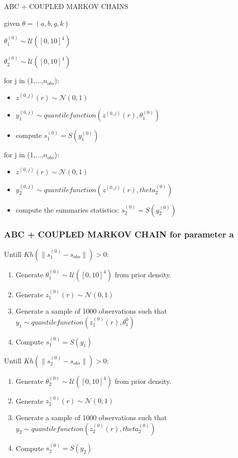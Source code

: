 \documentclass{beamer}
\begin{document}
\begin{section}{ABC + COUPLED MARKOV CHAINS}
\begin{frame}
	given $\theta =( a,b,g,k )$
	
	$ \theta_{1}^{(0)} \sim \mathcal{U}([0,10]^4)$
	
	$ \theta_{2}^{(0)} \sim \mathcal{U}([0,10]^4)$
	
	for j in (1,...,$n_{obs}$):
	\begin{itemize}
		\item $z^{(0,j)}(r) \sim \mathcal{N}(0,1)  $
		
		\item $ y_{1}^{(0,j)} \sim quantilefunction(z^{(0,j)}(r),\theta_{1}^{(0)})$
		
		\item compute $ s_{1}^{(0)} =S(y_{1}^{(0)})$
	\end{itemize}
	for j in (1,...,$n_{obs}$):
	
	\begin{itemize}
		\item $z^{(0,j)}(r) \sim \mathcal{N}(0,1)  $
		
		\item $ y_{2}^{(0,j)} \sim quantile function(z^{(0,j)}(r),theta_{2}^{(0)})$
		
		\item compute the summaries statistics:
		$ s_{2}^{(0)} =S(y_{2}^{(0)})$
	\end{itemize}
	
\end{frame}
\begin{frame}
	\frametitle{ABC + COUPLED MARKOV CHAIN for parameter a}
	Untill $Kh(\|s_{1}^{(0)} - s_{obs}\|)>0$:
	\begin{enumerate}
		\item Generate $\theta_{1}^{(0)} \sim \mathcal{U}([0,10]^4)$ from prior density.
		\item Generate $z_{1}^{(0)}(r) \sim \mathcal{N}(0,1)$
		\item Generate a sample of 1000 observations such that $y_{1} \sim quantile function(z_{1}^{(0)}(r),\theta_{1}^{0})$
		\item Compute $s_{1}^{(0)}=S(y_{1})$
		
	\end{enumerate}
	Untill $Kh(\|s_{2}^{(0)} - s_{obs}\|)>0$:
	\begin{enumerate}
		\item Generate $\theta_{2}^{(0)} \sim \mathcal{U}([0,10]^4)$ from prior density.
		\item Generate $z_{2}^{(0)}(r) \sim \mathcal{N}(0,1)$
		\item Generate a sample of 1000 observations such that $y_{2} \sim quantile function(z_{2}^{(0)}(r),theta_{2}^{(0)})$
		\item Compute $s_{2}^{(0)}=S(y_{2})$
	\end{enumerate}
	

\end{frame}
\end{section}
\end{document}
